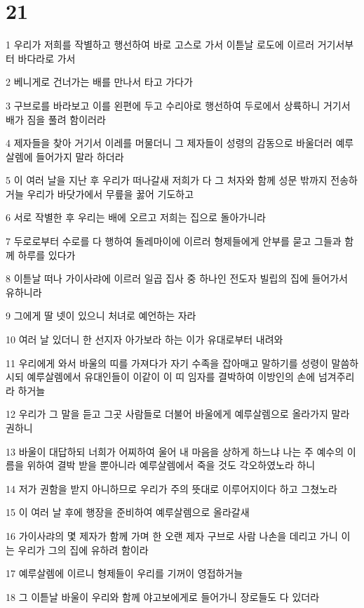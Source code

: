 \chapter{21}

\par 1 우리가 저희를 작별하고 행선하여 바로 고스로 가서 이튿날 로도에 이르러 거기서부터 바다라로 가서
\par 2 베니게로 건너가는 배를 만나서 타고 가다가
\par 3 구브로를 바라보고 이를 왼편에 두고 수리아로 행선하여 두로에서 상륙하니 거기서 배가 짐을 풀려 함이러라
\par 4 제자들을 찾아 거기서 이레를 머물더니 그 제자들이 성령의 감동으로 바울더러 예루살렘에 들어가지 말라 하더라
\par 5 이 여러 날을 지난 후 우리가 떠나갈새 저희가 다 그 처자와 함께 성문 밖까지 전송하거늘 우리가 바닷가에서 무릎을 꿇어 기도하고
\par 6 서로 작별한 후 우리는 배에 오르고 저희는 집으로 돌아가니라
\par 7 두로로부터 수로를 다 행하여 돌레마이에 이르러 형제들에게 안부를 묻고 그들과 함께 하루를 있다가
\par 8 이튿날 떠나 가이사랴에 이르러 일곱 집사 중 하나인 전도자 빌립의 집에 들어가서 유하니라
\par 9 그에게 딸 넷이 있으니 처녀로 예언하는 자라
\par 10 여러 날 있더니 한 선지자 아가보라 하는 이가 유대로부터 내려와
\par 11 우리에게 와서 바울의 띠를 가져다가 자기 수족을 잡아매고 말하기를 성령이 말씀하시되 예루살렘에서 유대인들이 이같이 이 띠 임자를 결박하여 이방인의 손에 넘겨주리라 하거늘
\par 12 우리가 그 말을 듣고 그곳 사람들로 더불어 바울에게 예루살렘으로 올라가지 말라 권하니
\par 13 바울이 대답하되 너희가 어찌하여 울어 내 마음을 상하게 하느냐 나는 주 예수의 이름을 위하여 결박 받을 뿐아니라 예루살렘에서 죽을 것도 각오하였노라 하니
\par 14 저가 권함을 받지 아니하므로 우리가 주의 뜻대로 이루어지이다 하고 그쳤노라
\par 15 이 여러 날 후에 행장을 준비하여 예루살렘으로 올라갈새
\par 16 가이사랴의 몇 제자가 함께 가며 한 오랜 제자 구브로 사람 나손을 데리고 가니 이는 우리가 그의 집에 유하려 함이라
\par 17 예루살렘에 이르니 형제들이 우리를 기꺼이 영접하거늘
\par 18 그 이튿날 바울이 우리와 함께 야고보에게로 들어가니 장로들도 다 있더라
